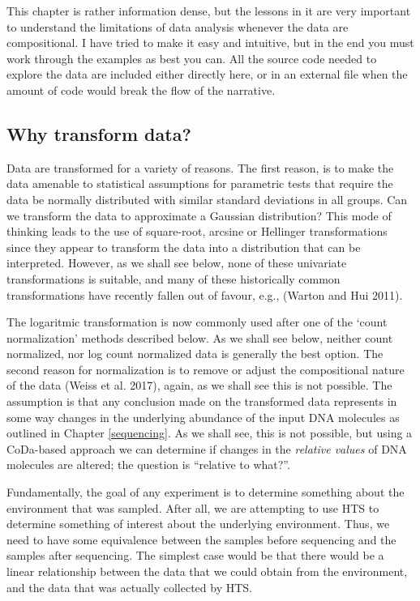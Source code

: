 \documentclass[onecolumn]{article}
\begin{document}
This chapter is rather information dense, but the lessons in it are very important to understand the limitations of data analysis whenever the data are compositional. I have tried to make it easy and intuitive, but in the end you must work through the examples as best you can. All the source code needed to explore the data are included either directly here, or in an external file when the amount of code would break the flow of the narrative.

\hypertarget{why-transform-data}{%
\subsection{Why transform data?}\label{why-transform-data}}

Data are transformed for a variety of reasons. The first reason, is to make the data amenable to statistical assumptions for parametric tests that require the data be normally distributed with similar standard deviations in all groups. Can we transform the data to approximate a Gaussian distribution? This mode of thinking leads to the use of square-root, arcsine or Hellinger transformations since they appear to transform the data into a distribution that can be interpreted. However, as we shall see below, none of these univariate transformations is suitable, and many of these historically common transformations have recently fallen out of favour, e.g., (Warton and Hui 2011).

The logaritmic transformation is now commonly used after one of the `count normalization' methods described below. As we shall see below, neither count normalized, nor log count normalized data is generally the best option. The second reason for normalization is to remove or adjust the compositional nature of the data (Weiss et al. 2017), again, as we shall see this is not possible. The assumption is that any conclusion made on the transformed data represents in some way changes in the underlying abundance of the input DNA molecules as outlined in Chapter \ref{sequencing}. As we shall see, this is not possible, but using a CoDa-based approach we can determine if changes in the \emph{relative values} of DNA molecules are altered; the question is ``relative to what?''.

Fundamentally, the goal of any experiment is to determine something about the environment that was sampled. After all, we are attempting to use HTS to determine something of interest about the underlying environment. Thus, we need to have some equivalence between the samples before sequencing and the samples after sequencing. The simplest case would be that there would be a linear relationship between the data that we could obtain from the environment, and the data that was actually collected by HTS.
\end{document}
